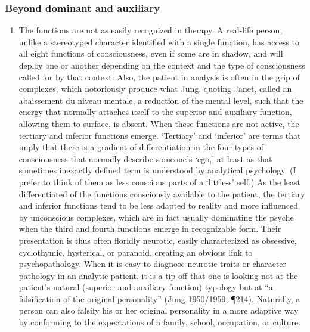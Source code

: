 \subsubsection{Beyond dominant and auxiliary}

\begin{enumerate}

\item {}
The functions are not as easily recognized in therapy. A real-life person,
unlike a stereotyped character identified with a single function, has access to
all eight functions of consciousness, even if some are in shadow, and will
deploy one or another depending on the context and the type of consciousness
called for by that context. Also, the patient in analysis is often in the grip
of complexes, which notoriously produce what Jung, quoting Janet, called an
abaissement du niveau mentale, a reduction of the mental level, such that the
energy that normally attaches itself to the superior and auxiliary function,
allowing them to surface, is absent. When these functions are not active, the
tertiary and inferior functions emerge. ‘Tertiary’ and ‘inferior’ are terms
that imply that there is a gradient of differentiation in the four types of
consciousness that normally describe someone’s ‘ego,’ at least as that
sometimes inexactly defined term is understood by analytical psychology. (I
prefer to think of them as less conscious parts of a ‘little-s’ self.) As the
least differentiated of the functions consciously available to the patient, the
tertiary and inferior functions tend to be less adapted to reality and more
influenced by unconscious complexes, which are in fact usually dominating the
psyche when the third and fourth functions emerge in recognizable form. Their
presentation is thus often floridly neurotic, easily characterized as
obsessive, cyclothymic, hysterical, or paranoid, creating an obvious link to
psychopathology. When it is easy to diagnose neurotic traits or character
pathology in an analytic patient, it is a tip-off that one is looking not at
the patient’s natural (superior and auxiliary function) typology but at “a
falsification of the original personality” (Jung 1950/1959, ¶214). Naturally, a
person can also falsify his or her original personality in a more adaptive way
by conforming to the expectations of a family, school, occupation, or culture.


\end{enumerate}

